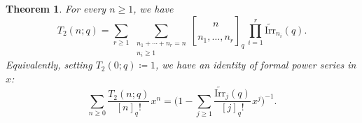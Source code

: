 \documentclass[10pt,a4paper]{amsart}
\numberwithin{equation}{section}
\newcommand{\ssp}{\hspace{1pt}}
\newtheorem{Theorem}{Theorem}[section]
\theoremstyle{definition}
\begin{document}
\begin{Theorem}\label{thm:q_exponential_first_return}
	For every $n\ge1$, we have
	\begin{equation}\label{eq:q_composition}
		T_2(n;q)
		=\sum_{r\ge1}\, \sum_{\substack{n_1+\cdots+n_r=n\\ n_i\ge1}}
		{n\brack n_1,\dots,n_r}_q\,
		\prod_{i=1}^{r}\widetilde{\mathrm{Irr}}_{n_i}(q).
	\end{equation}
	Equivalently, setting $T_2(0;q)\coloneqq1$, we have an identity of
	formal power series in $x$:
	\begin{equation}\label{eq:q_exponential_first_return}
		\sum_{n\ge0}\frac{T_2(n;q)}{[n]_q!}\ssp x^n
		=\biggl(1-\sum_{j\ge1}
		\frac{\widetilde{\mathrm{Irr}}_j(q)}{[j]_q!}\ssp x^j\biggr)^{-1}.
	\end{equation}
\end{Theorem}
\end{document}
